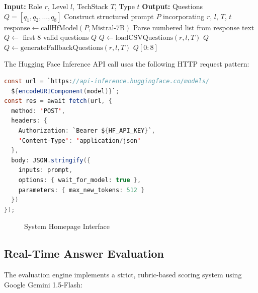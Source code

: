 \documentclass[12pt,a4paper,oneside]{report}
\begin{document}
\begin{algorithm}[H]
\caption{Interview Question Generation Algorithm}
\label{alg:question_generation}
\begin{algorithmic}[1]
\STATE \textbf{Input:} Role $r$, Level $l$, TechStack $T$, Type $t$
\STATE \textbf{Output:} Questions $Q = [q_1, q_2, \ldots, q_8]$
\STATE Construct structured prompt $P$ incorporating $r$, $l$, $T$, $t$
\STATE $\text{response} \gets \text{callHfModel}(P, \text{Mistral-7B})$
  \STATE Parse numbered list from response text
  \STATE $Q \gets$ first 8 valid questions
    \RETURN $Q$
  \ENDIF
\ENDIF
\STATE $Q \gets \text{loadCSVQuestions}(r, l, T)$
  \RETURN $Q$
\ENDIF
\STATE $Q \gets \text{generateFallbackQuestions}(r, l, T)$
\RETURN $Q[0{:}8]$
\end{algorithmic}
\end{algorithm}

The Hugging Face Inference API call uses the following HTTP request pattern:

\begin{lstlisting}[language=Java, caption={Hugging Face API Integration}, label={lst:hf_api}]
const url = `https://api-inference.huggingface.co/models/
  ${encodeURIComponent(model)}`;
const res = await fetch(url, {
  method: 'POST',
  headers: {
    Authorization: `Bearer ${HF_API_KEY}`,
    'Content-Type': 'application/json'
  },
  body: JSON.stringify({
    inputs: prompt,
    options: { wait_for_model: true },
    parameters: { max_new_tokens: 512 }
  })
});
\end{lstlisting}

\begin{figure}[H]
\centering
{}
\caption{System Homepage Interface}
\label{fig:homepage}
\end{figure}


\subsection{Real-Time Answer Evaluation}

The evaluation engine implements a strict, rubric-based scoring system using Google Gemini 1.5-Flash:
\end{document}

